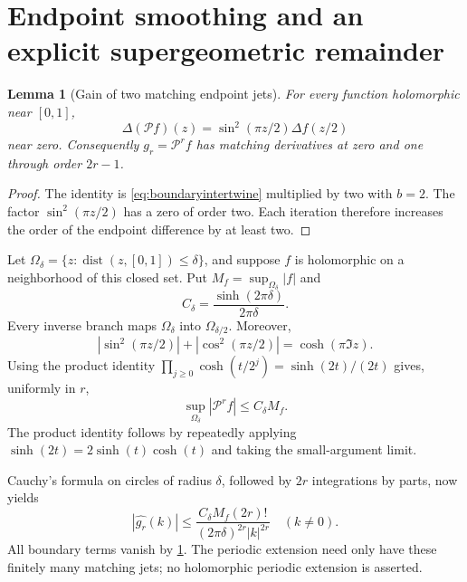 \documentclass[11pt,a4paper]{article}
\newtheorem{lemma}[theorem]{Lemma}
\theoremstyle{definition}
\theoremstyle{remark}
\newcommand{\Pop}{\mathcal P}
\newcommand{\abs}[1]{\left|#1\right|}
\numberwithin{equation}{section}
\begin{document}
\section{Endpoint smoothing and an explicit supergeometric remainder}
\label{sec:quantitative}

\begin{lemma}[Gain of two matching endpoint jets]
\label{lem:jets}
For every function holomorphic near $[0,1]$,
\begin{equation}
 \Delta(\Pop f)(z)=\sin^2(\pi z/2)\Delta f(z/2)
 \label{eq:jetidentity}
\end{equation}
near zero. Consequently $g_r=\Pop^rf$ has matching derivatives at zero and
one through order $2r-1$.
\end{lemma}
\begin{proof}
The identity is \cref{eq:boundaryintertwine} multiplied by two with $b=2$.
The factor $\sin^2(\pi z/2)$ has a zero of order two. Each iteration
therefore increases the order of the endpoint difference by at least two.
\end{proof}

Let $\Omega_\delta=\{z:\operatorname{dist}(z,[0,1])\le\delta\}$, and
suppose $f$ is holomorphic on a neighborhood of this closed set. Put
$M_f=\sup_{\Omega_\delta}|f|$ and
\begin{equation}
 C_\delta=\frac{\sinh(2\pi\delta)}{2\pi\delta}.
 \label{eq:Cdelta}
\end{equation}
Every inverse branch maps $\Omega_\delta$ into
$\Omega_{\delta/2}$. Moreover,
\[
 \abs{\sin^2(\pi z/2)}+\abs{\cos^2(\pi z/2)}
 =\cosh(\pi\Im z).
\]
Using the product identity
$\prod_{j\ge0}\cosh(t/2^j)=\sinh(2t)/(2t)$ gives, uniformly in $r$,
\begin{equation}
 \sup_{\Omega_\delta}|\Pop^rf|\le C_\delta M_f.
 \label{eq:uniform-complex-bound}
\end{equation}
The product identity follows by repeatedly applying
$\sinh(2t)=2\sinh(t)\cosh(t)$ and taking the small-argument limit.

Cauchy's formula on circles of radius $\delta$, followed by $2r$
integrations by parts, now yields
\begin{equation}
 |\widehat{g_r}(k)|\le
 \frac{C_\delta M_f(2r)!}{(2\pi\delta)^{2r}|k|^{2r}}
 \quad(k\ne0).
 \label{eq:Fourierboundgeneral}
\end{equation}
All boundary terms vanish by \cref{lem:jets}. The periodic extension need
only have these finitely many matching jets; no holomorphic periodic
extension is asserted.
\end{document}
